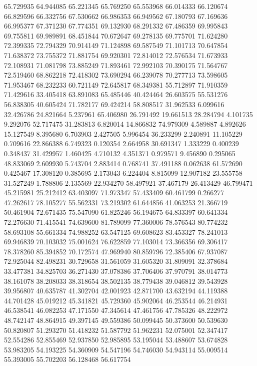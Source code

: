 65.729935
64.944085
65.221345
65.769250
65.553968
66.014333
66.120674
66.829596
66.332756
67.530662
66.986353
66.949562
67.180793
67.169636
66.995377
67.371230
67.774351
69.132930
68.291332
67.486359
69.995843
69.755811
69.989891
68.451844
70.672647
69.278135
69.775701
71.624280
72.399335
72.794329
70.914149
71.124898
69.587549
71.101713
70.647854
71.638372
73.755372
71.881754
69.920301
72.814012
72.576534
71.673933
72.108931
71.081798
73.885249
71.893461
72.992103
70.390175
71.564767
72.519460
68.862218
72.418302
73.690294
66.239078
70.277713
73.598605
71.953467
68.232233
60.721149
72.645817
68.349381
55.712897
71.910359
71.429616
33.405418
63.891083
65.485446
40.424464
26.603575
55.531276
56.838305
40.605424
71.782177
69.424214
58.808517
31.962533
6.099616
32.426786
24.821664
5.237961
65.406980
26.791492
19.661513
28.284794
4.101735
9.292076
52.717475
31.283813
6.820014
14.866832
74.979309
4.589887
4.892626
15.127549
8.395680
6.703903
2.427505
5.996454
36.233299
2.240891
11.105229
0.709616
22.866388
6.749323
0.120354
2.664958
30.691347
1.333229
0.400239
0.348437
31.429957
1.460425
4.710132
4.351371
0.979571
9.456890
0.295065
48.833069
2.609930
5.743704
2.883414
0.768741
37.491188
0.062638
61.572690
0.425467
17.308120
0.385695
2.173043
6.224404
8.815099
12.907182
23.555758
31.527249
1.788806
2.135569
22.934270
58.497921
37.467179
26.413429
46.799471
45.215981
25.212412
63.403097
71.973347
57.433409
60.461799
0.266277
47.262617
78.105277
55.562331
73.219302
61.644856
41.063253
21.366719
50.461904
72.671435
75.547090
61.825246
56.194675
64.833397
60.641334
72.276630
71.415541
74.639600
81.789099
77.360006
78.576543
80.774232
58.693108
55.661334
74.988252
63.547125
69.608623
83.453327
78.241013
69.946839
70.103032
75.001624
76.622859
77.103014
73.366356
69.306417
78.378260
85.394852
70.172574
47.969940
80.859796
72.385406
67.937087
72.925044
82.498231
30.729658
31.561059
31.605320
31.809091
32.378684
33.477381
34.825703
36.271430
37.078386
37.706406
37.970791
38.014773
38.161078
38.208033
38.318654
38.502135
38.779438
39.046812
39.543928
39.956807
40.635787
41.302704
42.001923
42.871700
43.632194
44.119388
44.701428
45.019212
45.341821
45.729360
45.902064
46.253544
46.214931
46.538541
46.082253
47.171550
47.345614
47.461756
47.785326
48.222972
48.742147
48.864915
49.397145
49.559386
50.099445
50.373600
50.539630
50.820807
51.293270
51.418232
51.587792
51.962231
52.075001
52.347417
52.554286
52.855469
52.937850
52.985895
53.195044
53.488607
53.674828
53.983205
54.193225
54.360909
54.547196
54.746030
54.943114
55.009514
55.393005
55.702203
56.128468
56.617754
